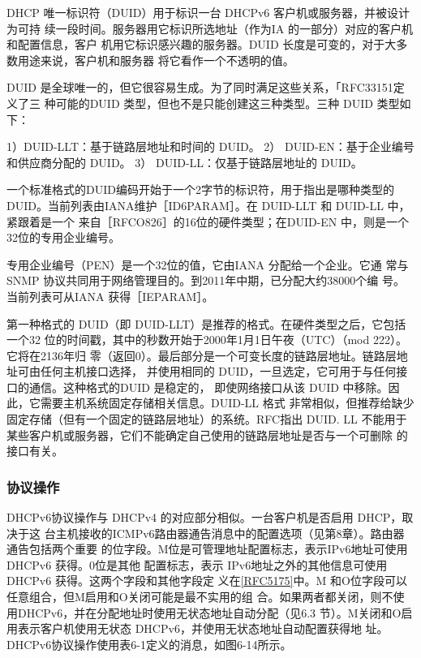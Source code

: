 DHCP 唯一标识符（DUID）用于标识一台 DHCPv6 客户机或服务器，并被设计为可持
续一段时间。服务器用它标识所选地址（作为IA 的一部分）对应的客户机和配置信息，客户
机用它标识感兴趣的服务器。DUID 长度是可变的，对于大多数用途来说，客户机和服务器
将它看作一个不透明的值。

DUID 是全球唯一的，但它很容易生成。为了同时满足这些关系，「RFC33151定义了三
种可能的DUID 类型，但也不是只能创建这三种类型。三种 DUID 类型如下：

1）DUID-LLT：基于链路层地址和时间的 DUID。
2） DUID-EN：基于企业编号和供应商分配的 DUID。
3） DUID-LL：仅基于链路层地址的 DUID。

一个标准格式的DUID编码开始于一个2字节的标识符，用于指出是哪种类型的
DUID。当前列表由IANA维护［ID6PARAM］。在 DUID-LLT 和 DUID-LL 中，紧跟着是一个
来自［RFCO826］的16位的硬件类型；在DUID-EN 中，则是一个32位的专用企业编号。

\begin{tcolorbox}
  专用企业编号（PEN）是一个32位的值，它由IANA 分配给一个企业。它通
  常与 SNMP 协议共同用于网络管理目的。到2011年中期，已分配大约38000个编
  号。当前列表可从IANA 获得［IEPARAM］。
\end{tcolorbox}

第一种格式的 DUID（即 DUID-LLT）是推荐的格式。在硬件类型之后，它包括一个32
位的时间戳，其中的秒数开始于2000年1月1日午夜（UTC）（mod 222）。它将在2136年归
零（返回0）。最后部分是一个可变长度的链路层地址。链路层地址可由任何主机接口选择，
并使用相同的 DUID，一旦选定，它可用于与任何接口的通信。这种格式的DUID 是稳定的，
即使网络接口从该 DUID 中移除。因此，它需要主机系统固定存储相关信息。DUID-LL 格式
非常相似，但推荐给缺少固定存储（但有一个固定的链路层地址）的系统。RFC指出 DUID.
LL 不能用于某些客户机或服务器，它们不能确定自己使用的链路层地址是否与一个可删除
的接口有关。

\subsubsection{协议操作}
DHCPv6协议操作与 DHCPv4 的对应部分相似。一台客户机是否启用 DHCP，取决于这
台主机接收的ICMPv6路由器通告消息中的配置选项（见第8章）。路由器通告包括两个重要
的位字段。M位是可管理地址配置标志，表示IPv6地址可使用DHCPv6 获得。0位是其他
配置标志，表示 IPv6地址之外的其他信息可使用DHCPv6 获得。这两个字段和其他字段定
义在\href{https://www.rfc-editor.org/rfc/rfc5175}{\href{https://www.rfc-editor.org/rfc/rfc5175}{[RFC5175]}}中。M
和O位字段可以任意组合，但M启用和O关闭可能是最不实用的组
合。如果两者都关闭，则不使用DHCPv6，并在分配地址时使用无状态地址自动分配（见6.3
节）。M关闭和O启用表示客户机使用无状态 DHCPv6，并使用无状态地址自动配置获得地
址。DHCPv6协议操作使用表6-1定义的消息，如图6-14所示。

